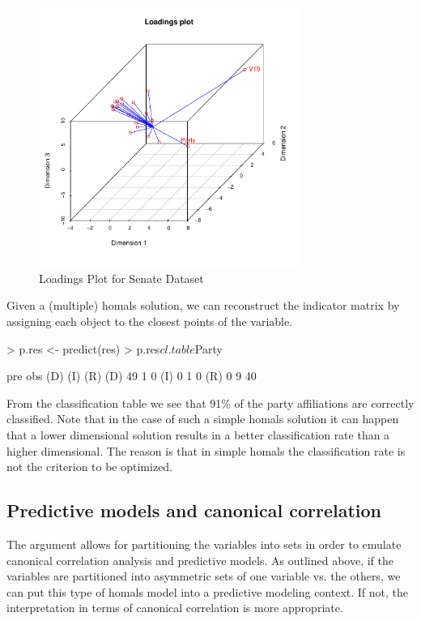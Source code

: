 \documentclass[article, nojss]{jss}
\begin{document}
\begin{figure}[ht]
\begin{center}
\includegraphics[height=85mm, width=85mm]{senateload.pdf}
\caption{\label{fig:senload} Loadings Plot for Senate Dataset}
\end{center}
\end{figure}

Given a (multiple) homals solution, we can reconstruct the indicator matrix by assigning each object to the closest points of the variable.

\begin{Schunk}
\begin{Sinput}
> p.res <- predict(res)
> p.res$cl.table$Party
\end{Sinput}
\begin{Soutput}
     pre
obs   (D) (I) (R)
  (D)  49   1   0
  (I)   0   1   0
  (R)   0   9  40
\end{Soutput}
\end{Schunk}

From the classification table we see that 91\% of the party affiliations are correctly classified. Note that in the case of such a simple homals solution it can happen that a lower dimensional solution results in a better classification rate than a higher dimensional. The reason is that in simple homals the classification rate is not the criterion to be optimized. 


\subsection{Predictive models and canonical correlation}
\label{sec:pmcca}
The  argument allows for partitioning the variables into sets in order to emulate canonical correlation analysis and predictive models. As outlined above, if the variables are partitioned into asymmetric sets of one variable vs. the others, we can put this type of homals model into a predictive modeling context. If not, the interpretation in terms of canonical correlation is more appropriate. 
\end{document}

